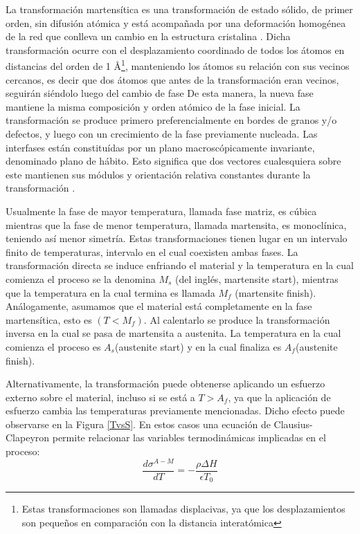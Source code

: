 \documentclass[12pt]{article}
\theoremstyle{definition}
\theoremstyle{remark}
\begin{document}
La transformación martensítica es una transformación de estado sólido, de primer orden, sin difusión atómica y está acompañada por una deformación homogénea de la red que conlleva un cambio en la estructura cristalina \cite{Santamarta}. Dicha transformación ocurre con el desplazamiento coordinado de todos los átomos en distancias del orden de 1 \AA \footnote{Estas transformaciones son llamadas displacivas, ya que los desplazamientos son pequeños en comparación con la distancia interatómica}, manteniendo los átomos su relación con sus vecinos cercanos, es decir que dos átomos que antes de la transformación eran vecinos, seguirán siéndolo luego del cambio de fase\citep{HTSMA} De esta manera, la nueva fase mantiene la misma composición y orden atómico de la fase inicial. La transformación se produce primero preferencialmente en bordes de granos y/o defectos, y luego con un crecimiento de la fase previamente nucleada. Las interfases están constituídas por un plano macroscópicamente invariante, denominado plano de hábito. Esto significa que dos vectores cualesquiera sobre este mantienen sus módulos y orientación relativa constantes durante la transformación \cite{Santamarta}.

Usualmente la fase de mayor temperatura, llamada fase matriz, es cúbica mientras que la fase de menor temperatura, llamada martensita, es monoclínica, teniendo así menor simetría\cite{Malvasio}. Estas transformaciones tienen lugar en un intervalo finito de temperaturas, intervalo en el cual coexisten ambas fases. La transformación directa se induce enfriando el material y la temperatura en la cual comienza el proceso se la denomina $M_s$ (del inglés, martensite start), mientras que la temperatura en la cual termina es llamada $M_f$ (martensite finish). Análogamente, asumamos que el material está completamente en la fase martensítica, esto es $(T < M_f)$. Al calentarlo se produce la transformación inversa en la cual se pasa de martensita a austenita. La temperatura en la cual comienza el proceso es $A_s$(austenite start) y en la cual finaliza es $A_f$(austenite finish).\cite{Santamarta}

Alternativamente, la transformación puede obtenerse aplicando un esfuerzo externo sobre el material, incluso si se está a $T > A_f$, ya que la aplicación de esfuerzo cambia las temperaturas previamente mencionadas. Dicho efecto puede observarse en la Figura \ref{TvsS}. En estos casos una ecuación de Clausius-Clapeyron permite relacionar las variables termodinámicas implicadas en el proceso:
\begin{equation}
	\frac{d\sigma^{A-M}}{dT} = -\frac{\rho \Delta H}{\epsilon T_0}
\end{equation}
\end{document}
